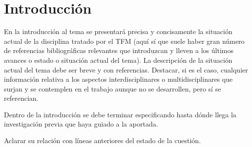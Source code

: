 \newpage\mbox{}\thispagestyle{empty}

\chapter{Introducción}

En la introducción al tema se presentará precisa y concisamente la situación actual de 
   la disciplina tratado por el TFM (aquí sí que suele haber gran número de referencias 
   bibliográficas relevantes que introduzcan y lleven a los últimos avances o estado o 
   situación actual del tema).
   La descripción de la situación actual del tema debe ser breve y con referencias.
   Destacar, si es el caso, cualquier información relativa a los aspectos interdisciplinares o 
   multidisciplinares que surjan y se contemplen en el trabajo aunque no se desarrollen, 
   pero sí se referencian.

   Dentro de la introducción se debe terminar especificando hasta dónde llega la 
   investigación previa que haya guiado a la aportada.
   
   Aclarar su relación con líneas anteriores del estado de la cuestión.
